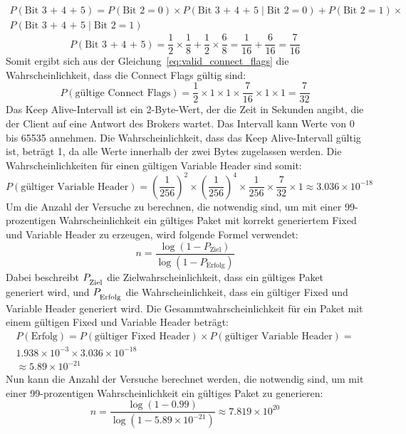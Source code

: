 \begin{multline}
    P(\text{Bit 3 + 4 + 5}) = P(\text{Bit 2} = 0) \times P(\text{Bit 3 + 4 + 5} \mid \text{Bit 2} = 0)+ P(\text{Bit 2} = 1) \times \\
    P(\text{Bit 3 + 4 + 5} \mid \text{Bit 2} = 1)
\end{multline}
\[
    P(\text{Bit 3 + 4 + 5}) = \frac{1}{2} \times \frac{1}{8}+ \frac{1}{2} \times \frac{6}{8}= \frac{1}{16}+ \frac{6}{16}= \frac{7}{16}
\]
Somit ergibt sich aus der Gleichung~\ref{eq:valid_connect_flags} die Wahrscheinlichkeit, dass die Connect Flags gültig sind:
\[
    P(\text{gültige Connect Flags}) = \frac{1}{2} \times 1 \times 1 \times \frac{7}{16} \times 1 \times 1 = \frac{7}{32}
\]
Das Keep Alive-Intervall ist ein 2-Byte-Wert, der die Zeit in Sekunden angibt, die der Client auf eine Antwort des Brokers
wartet.
Das Intervall kann Werte von 0 bis 65535 annehmen.
Die Wahrscheinlichkeit, dass das Keep Alive-Intervall gültig ist, beträgt 1, da alle Werte innerhalb der zwei Bytes zugelassen
werden.\newline
Die Wahrscheinlichkeiten für einen gültigen Variable Header sind somit:
\[
    P(\text{gültiger Variable Header}) = \left(\frac{1}{256}\right)^2 \times \left(\frac{1}{256}\right)^4 \times \frac{1}{256} \times \frac{7}{32} \times 1 \approx 3.036 \times 10^{-18}
\]
Um die Anzahl der Versuche zu berechnen, die notwendig sind, um mit einer 99-prozentigen Wahrscheinlichkeit ein gültiges
Paket mit korrekt generiertem Fixed und Variable Header zu erzeugen, wird folgende Formel verwendet:
\[
    n = \frac{\log(1 - P_{\text{Ziel}})}{\log(1 - P_{\text{Erfolg}})}
\]
Dabei beschreibt \textit{$P_{\textsubscript{Ziel}}$} die Zielwahrscheinlichkeit, dass ein gültiges Paket generiert wird, und
\textit{$P_{\textsubscript{Erfolg}}$} die Wahrscheinlichkeit, dass ein gültiger Fixed und Variable Header generiert wird.
Die Gesammtwahrscheinlichkeit für ein Paket mit einem gültigen Fixed und Variable Header beträgt:
\begin{multline}
    P(\text{Erfolg}) = P(\text{gültiger Fixed Header}) \times P(\text{gültiger Variable Header}) = \\
    1.938 \times 10^{-3} \times 3.036 \times 10^{-18} \\
    \approx 5.89 \times 10^{-21}
\end{multline}
Nun kann die Anzahl der Versuche berechnet werden, die notwendig sind, um mit einer 99-prozentigen Wahrscheinlichkeit ein
gültiges Paket zu generieren:
\[
    n = \frac{\log(1 - 0.99)}{\log(1 - 5.89 \times 10^{-21})} \approx 7.819 \times 10^{20}
\]

